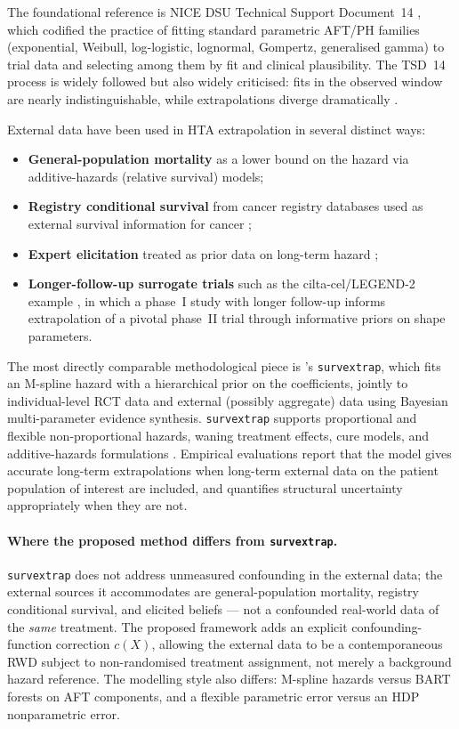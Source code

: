 \documentclass[11pt]{article}
\theoremstyle{plain}
\theoremstyle{definition}
\theoremstyle{remark}
\newcommand{\1}{\mathds{1}}
\newcommand{\X}{X}
\newcommand{\cf}{c}
\begin{document}
The foundational reference is NICE DSU Technical Support Document~14
\citep{Latimer2013}, which codified the practice of fitting standard
parametric AFT/PH families (exponential, Weibull, log-logistic, lognormal,
Gompertz, generalised gamma) to trial data and selecting among them by
fit and clinical plausibility. The TSD~14 process is widely followed but
also widely criticised: fits in the observed window are nearly
indistinguishable, while extrapolations diverge dramatically
\citep{BellGorrod2019, Bagust2014}.

External data have been used in HTA extrapolation in several distinct ways:
\begin{itemize}[leftmargin=*]
  \item \textbf{General-population mortality} as a lower bound on the
        hazard via additive-hazards (relative survival) models;
  \item \textbf{Registry conditional survival} from cancer registry
        databases used as external survival information for cancer
        \citep{Guyot2017};
  \item \textbf{Expert elicitation} treated as prior data on long-term hazard
        \citep{Guyot2017};
  \item \textbf{Longer-follow-up surrogate trials} such as the
        cilta-cel/LEGEND-2 example \citep{Vyas2023}, in which a phase~I
        study with longer follow-up informs extrapolation of a pivotal
        phase~II trial through informative priors on shape parameters.
\end{itemize}

The most directly comparable methodological piece is \citet{Jackson2023}'s
\texttt{survextrap}, which fits an M-spline hazard with a hierarchical prior
on the coefficients, jointly to individual-level RCT data and external
(possibly aggregate) data using Bayesian multi-parameter evidence synthesis.
\texttt{survextrap} supports proportional and flexible non-proportional
hazards, waning treatment effects, cure models, and additive-hazards
formulations \citep{Jackson2023}. Empirical evaluations
\citep{Timmins2025} report that the model gives accurate long-term
extrapolations when long-term external data on the patient population of
interest are included, and quantifies structural uncertainty appropriately
when they are not.

\paragraph{Where the proposed method differs from \texttt{survextrap}.}
\texttt{survextrap} does not address unmeasured confounding in the external
data; the external sources it accommodates are general-population mortality,
registry conditional survival, and elicited beliefs --- not a confounded
real-world data of the \emph{same} treatment. The proposed framework
adds an explicit confounding-function correction $\cf(\X)$, allowing the
external data to be a contemporaneous RWD subject to non-randomised
treatment assignment, not merely a background hazard reference. The
modelling style also differs: M-spline hazards versus BART forests on
AFT components, and a flexible parametric error versus an HDP nonparametric
error.
\end{document}
